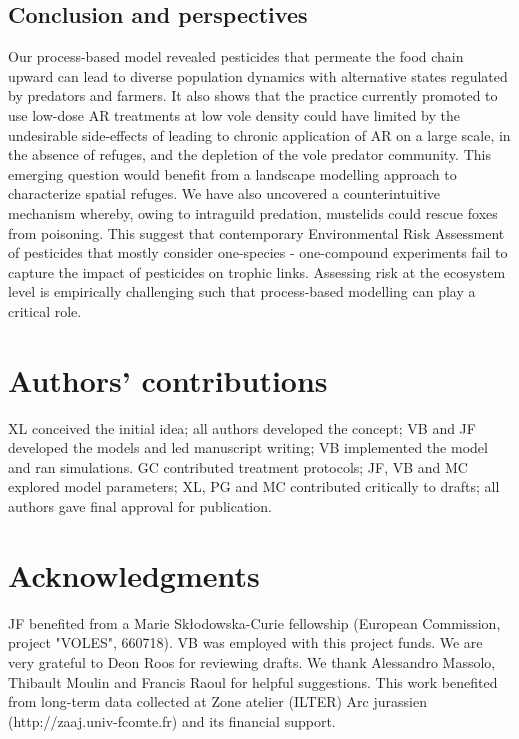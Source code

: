 \documentclass[11pt]{article}
\begin{document}
\subsection{Conclusion and perspectives}

Our process-based model revealed pesticides that permeate the food chain upward can lead to diverse population dynamics with alternative states regulated by predators and farmers. It also shows that the practice currently promoted to use low-dose AR treatments at low vole density could have limited by the undesirable side-effects of leading to chronic application of AR on a large scale, in the absence of refuges, and the depletion of the vole predator community. This emerging question would benefit from a landscape modelling approach to characterize spatial refuges. We have also uncovered a counterintuitive mechanism whereby, owing to intraguild predation, mustelids could rescue foxes from poisoning. This suggest that contemporary Environmental Risk Assessment of pesticides that mostly consider one-species - one-compound experiments fail to capture the impact of pesticides on trophic links.  Assessing risk at the ecosystem level is empirically challenging such that process-based modelling can play a critical role. 

\section*{Authors’ contributions}
	
XL conceived the initial idea; all authors developed the concept; VB and JF developed the models and led manuscript writing; VB implemented the model and ran simulations. GC contributed treatment protocols; JF, VB and MC explored model parameters; XL, PG and MC contributed critically to drafts; all authors gave final approval for publication.


\section*{Acknowledgments}

JF benefited from a Marie Skłodowska-Curie fellowship (European Commission, project "VOLES", 660718). VB was employed with this project funds. We are very grateful to Deon Roos for reviewing drafts. We thank Alessandro Massolo, Thibault Moulin and Francis Raoul for helpful suggestions. This work benefited from long-term data collected at Zone atelier (ILTER) Arc jurassien (http://zaaj.univ-fcomte.fr) and its financial support.
\end{document}

